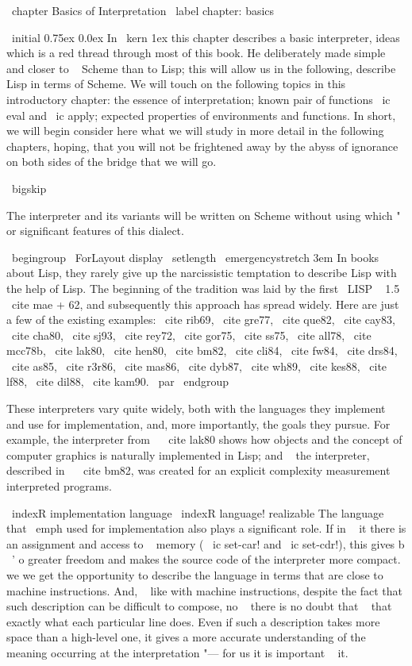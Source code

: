 \ chapter {Basics of Interpretation} \ label {chapter: basics}

\ initial {0.75ex} {0.0ex} {In} { \ kern 1ex this chapter} describes a basic interpreter, ideas
which is a red thread through most of this book. He deliberately
made simple and closer to ~ Scheme than to Lisp; this will allow us
in the following, describe Lisp in terms of Scheme. We will touch on the following topics in this
introductory chapter: the essence of interpretation; known pair of functions \ ic {eval} and
\ ic {apply}; expected properties of environments and functions. In short, we will begin
consider here what we will study in more detail in the following chapters, hoping,
that you will not be frightened away by the abyss of ignorance on both sides of the bridge that we will go.

\ bigskip

The interpreter and its variants will be written on Scheme without using
which "~ or significant features of this dialect.

\ begingroup
\ ForLayout {display} { \ setlength { \ emergencystretch } {3em}}
In books about Lisp, they rarely give up the narcissistic temptation to describe
Lisp with the help of Lisp. The beginning of the tradition was laid by the first
\ LISP ~ 1.5 \ cite {mae + 62}, and subsequently this approach has spread widely.
Here are just a few of the existing examples: \ cite {rib69}, \ cite {gre77},
\ cite {que82}, \ cite {cay83}, \ cite {cha80}, \ cite {sj93}, \ cite {rey72},
\ cite {gor75}, \ cite {ss75}, \ cite {all78}, \ cite {mcc78b}, \ cite {lak80},
\ cite {hen80}, \ cite {bm82}, \ cite {cli84}, \ cite {fw84}, \ cite {drs84},
\ cite {as85}, \ cite {r3r86}, \ cite {mas86}, \ cite {dyb87}, \ cite {wh89},
\ cite {kes88}, \ cite {lf88}, \ cite {dil88}, \ cite {kam90}. \ par \ endgroup

These interpreters vary quite widely, both with the languages ​​they implement
and use for implementation, and, more importantly, the goals they
pursue. For example, the interpreter from ~ \ cite {lak80} shows how objects
and the concept of computer graphics is naturally implemented in Lisp;
and ~ the interpreter, described in ~ \ cite {bm82}, was created for an explicit complexity measurement
interpreted programs.

\ indexR {implementation language}
\ indexR {language! realizable}
The language that \ emph {used} for implementation also plays a significant role. If in ~ it
there is an assignment and access to ~ memory ( \ ic {set-car!} and \ ic {set-cdr!}), this gives
b \ ' {o} greater freedom and makes the source code of the interpreter more compact. we
we get the opportunity to describe the language in terms that are close to machine
instructions. And, ~ like with machine instructions, despite the fact that such
description can be difficult to compose, no ~ there is no doubt that ~ that
exactly what each particular line does. Even if such a description takes
more space than a high-level one, it gives a more accurate understanding of the meaning
occurring at the interpretation "--- for us it is important ~ it.

